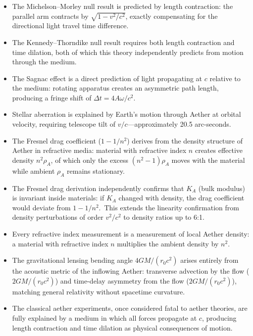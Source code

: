 ﻿\documentclass[12pt,letterpaper]{article}
\newcommand{\rhoa}{\rho_{\!A}}
\newcommand{\Ka}{K_{\!A}}
\begin{document}
\begin{itemize}[leftmargin=2em]
  \item The Michelson--Morley null result is predicted by length contraction: the parallel arm
    contracts by $\sqrt{1 - v^2/c^2}$, exactly compensating for the directional light travel
    time difference.
  \item The Kennedy--Thorndike null result requires both length contraction and time dilation,
    both of which this theory independently predicts from motion through the medium.
  \item The Sagnac effect is a direct prediction of light propagating at $c$ relative to the
    medium: rotating apparatus creates an asymmetric path length, producing a fringe shift
    of $\Delta t = 4A\omega/c^2$.
  \item Stellar aberration is explained by Earth's motion through Aether at orbital velocity,
    requiring telescope tilt of $v/c$---approximately 20.5 arc-seconds.
  \item The Fresnel drag coefficient ($1 - 1/n^2$) derives from the density structure of Aether
    in refractive media: material with refractive index $n$ creates effective density
    $n^2 \rhoa$, of which only the excess $(n^2 - 1)\rhoa$ moves with the material while
    ambient $\rhoa$ remains stationary.
  \item The Fresnel drag derivation independently confirms that $\Ka$ (bulk modulus) is invariant
    inside materials: if $\Ka$ changed with density, the drag coefficient would deviate from
    $1 - 1/n^2$.\ This extends the linearity confirmation from density perturbations of order
    $v^2/c^2$ to density ratios up to 6:1.
  \item Every refractive index measurement is a measurement of local Aether density: a material
    with refractive index $n$ multiplies the ambient density by $n^2$.
  \item The gravitational lensing bending angle $4GM/(r_0 c^2)$ arises entirely from the
    acoustic metric of the inflowing Aether: transverse advection by the flow
    ($2GM/(r_0 c^2)$) and time-delay asymmetry from the flow ($2GM/(r_0 c^2)$),
    matching general relativity without spacetime curvature.
  \item The classical aether experiments, once considered fatal to aether theories, are fully
    explained by a medium in which all forces propagate at $c$, producing length contraction
    and time dilation as physical consequences of motion.
\end{itemize}
\end{document}
